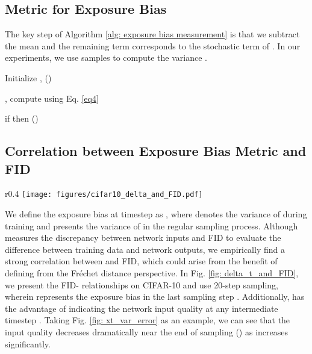 \documentclass{article} \usepackage{iclr2024_conference,times}
\begin{document}
\subsection{Metric for Exposure Bias}
\label{Append:0}
The key step of Algorithm \ref{alg: exposure bias measurement} is that we subtract the mean  and the remaining term  corresponds to the stochastic term of . In our experiments, we use  samples to compute the variance .


\begin{algorithm}[h]
   \caption{Measurement of Exposure Bias }
   \label{alg: exposure bias measurement}
\begin{algorithmic}[1]
        \STATE Initialize ,  ()
        
        \REPEAT
        \STATE , 
        \STATE compute  using Eq. \ref{eq4}
        
        \FOR{}
        \STATE if  then 
        \STATE  \quad ()
        \STATE  
        \ENDFOR
        
        \FOR{}
        \STATE 
        \STATE 
        \ENDFOR
    \end{algorithmic}
\end{algorithm}



\subsection{Correlation between Exposure Bias Metric and FID}
\label{Append: delta_t and FID}

\begin{wrapfigure}{r}{0.4\textwidth}
\vskip -0.3in
  \texttt{[image: figures/cifar10\_delta\_and\_FID.pdf]}
  \captionsetup{skip=2pt}
  \caption{Correlation between FID - .}
  \label{fig: delta_t_and_FID}
\vskip -0.6in
\end{wrapfigure}

We define the exposure bias at timestep  as 
, where  denotes the variance of  during training and  presents the variance of  in the regular sampling process. Although  measures the discrepancy between network inputs and FID to evaluate the difference between training data and network outputs, we empirically find a strong correlation between  and FID, which could arise from the benefit of defining  from 
 the Fréchet distance \citet{dowson1982frechet} perspective. In Fig. \ref{fig: delta_t_and_FID}, we present the FID- relationships on CIFAR-10 and use 20-step sampling, wherein  represents the exposure bias in the last sampling step . Additionally,  has the advantage of indicating the network input quality at any intermediate timestep . Taking Fig. \ref{fig: xt_var_error} as an example, we can see that the input quality decreases dramatically near the end of sampling () as  increases significantly.
\end{document}
